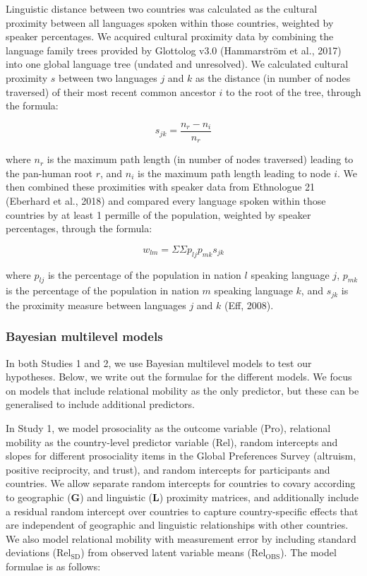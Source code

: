 \documentclass[
  man,floatsintext]{apa6}
\begin{document}
Linguistic distance between two countries was calculated as the cultural proximity between all languages spoken within those countries, weighted by speaker percentages. We acquired cultural proximity data by combining the language family trees provided by Glottolog v3.0 (Hammarström et al., 2017) into one global language tree (undated and unresolved). We calculated cultural proximity \(s\) between two languages \(j\) and \(k\) as the distance (in number of nodes traversed) of their most recent common ancestor \(i\) to the root of the tree, through the formula:

\[
s_{jk} = \frac{n_{r}-n_{i}}{n_{r}}
\]

where \(n_{r}\) is the maximum path length (in number of nodes traversed) leading to the pan-human root \(r\), and \(n_{i}\) is the maximum path length leading to node \(i\). We then combined these proximities with speaker data from Ethnologue 21 (Eberhard et al., 2018) and compared every language spoken within those countries by at least 1 permille of the population, weighted by speaker percentages, through the formula:

\[
w_{lm} = {\Sigma}{\Sigma}p_{lj}p_{mk}s_{jk}
\]

where \(p_{lj}\) is the percentage of the population in nation \(l\) speaking language \(j\), \(p_{mk}\) is the percentage of the population in nation \(m\) speaking language \(k\), and \(s_{jk}\) is the proximity measure between languages \(j\) and \(k\) (Eff, 2008).

\hypertarget{bayesian-multilevel-models}{%
\subsubsection{Bayesian multilevel models}\label{bayesian-multilevel-models}}

In both Studies 1 and 2, we use Bayesian multilevel models to test our hypotheses. Below, we write out the formulae for the different models. We focus on models that include relational mobility as the only predictor, but these can be generalised to include additional predictors.

In Study 1, we model prosociality as the outcome variable (\(\text{Pro}\)), relational mobility as the country-level predictor variable (\(\text{Rel}\)), random intercepts and slopes for different prosociality items in the Global Preferences Survey (altruism, positive reciprocity, and trust), and random intercepts for participants and countries. We allow separate random intercepts for countries to covary according to geographic (\(\textbf{G}\)) and linguistic (\(\textbf{L}\)) proximity matrices, and additionally include a residual random intercept over countries to capture country-specific effects that are independent of geographic and linguistic relationships with other countries. We also model relational mobility with measurement error by including standard deviations (\(\text{Rel}_{\text{SD}}\)) from observed latent variable means (\(\text{Rel}_{\text{OBS}}\)). The model formulae is as follows:
\end{document}
